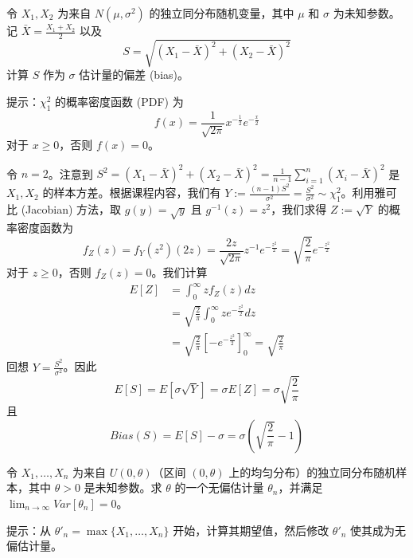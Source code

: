 \begin{questions}
\question
令 $X_1, X_2$ 为来自 $N(\mu, \sigma^2)$ 的独立同分布随机变量，其中 $\mu$ 和 $\sigma$ 为未知参数。记 $\bar{X} = \frac{X_1 + X_2}{2}$ 以及
\[
S = \sqrt{(X_1 - \bar{X})^2 + (X_2 - \bar{X})^2}
\]
计算 $S$ 作为 $\sigma$ 估计量的偏差 (bias)。

提示：$\chi^2_1$ 的概率密度函数 (PDF) 为
\[
f(x) = \frac{1}{\sqrt{2\pi}} x^{-\frac{1}{2}} e^{-\frac{x}{2}}
\]
对于 $x \ge 0$，否则 $f(x) = 0$。

\begin{solution}
令 $n = 2$。注意到 $S^2 = (X_1 - \bar{X})^2 + (X_2 - \bar{X})^2 = \frac{1}{n-1} \sum_{i=1}^n (X_i - \bar{X})^2$ 是 $X_1, X_2$ 的样本方差。根据课程内容，我们有 $Y := \frac{(n - 1)S^2}{\sigma^2} = \frac{S^2}{\sigma^2} \sim \chi^2_1$。利用雅可比 (Jacobian) 方法，取 $g(y) = \sqrt{y}$ 且 $g^{-1}(z) = z^2$，我们求得 $Z := \sqrt{Y}$ 的概率密度函数为
\[
f_Z(z) = f_Y(z^2)(2z) = \frac{2z}{\sqrt{2\pi}} z^{-1} e^{-\frac{z^2}{2}} = \sqrt{\frac{2}{\pi}} e^{-\frac{z^2}{2}}
\]
对于 $z \ge 0$，否则 $f_Z(z) = 0$。我们计算
\begin{align*}
E[Z] &= \int_0^\infty z f_Z(z) dz\\
&= \sqrt{\frac{2}{\pi}} \int_0^\infty z e^{-\frac{z^2}{2}} dz\\
&= \sqrt{\frac{2}{\pi}} \left[ -e^{-\frac{z^2}{2}} \right]_0^\infty = \sqrt{\frac{2}{\pi}}
\end{align*}
回想 $Y = \frac{S^2}{\sigma^2}$。因此
\[
E[S] = E[\sigma \sqrt{Y}] = \sigma E[Z] = \sigma \sqrt{\frac{2}{\pi}}
\]
且
\[
Bias(S) = E[S] - \sigma = \sigma \left( \sqrt{\frac{2}{\pi}} - 1 \right)
\]
\end{solution}

\question
令 $X_1, \dots, X_n$ 为来自 $U(0, \theta)$（区间 $(0, \theta)$ 上的均匀分布）的独立同分布随机样本，其中 $\theta > 0$ 是未知参数。求 $\theta$ 的一个无偏估计量 $\theta_n$，并满足 $\lim_{n \to \infty} Var[\theta_n] = 0$。

提示：从 $\theta'_n = \max\{X_1, \dots, X_n\}$ 开始，计算其期望值，然后修改 $\theta'_n$ 使其成为无偏估计量。


\end{questions}

